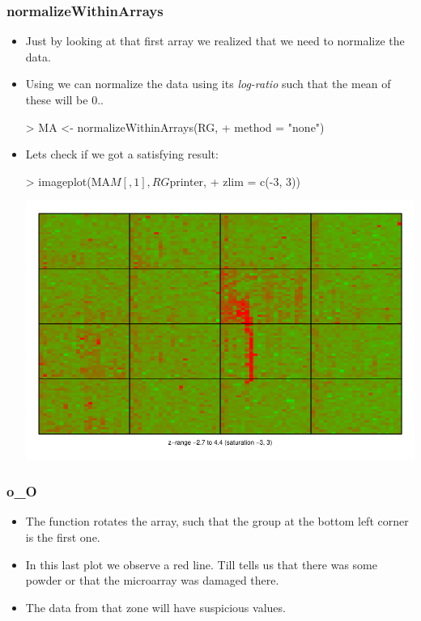 \begin{frame}
  \frametitle{normalizeWithinArrays}
  \begin{itemize}
  \item Just by looking at that first array we realized that we need to normalize the data.
  \item Using  we can normalize the data using its \emph{log-ratio} such that the mean of these will be 0..
\begin{Schunk}
\begin{Sinput}
> MA <- normalizeWithinArrays(RG, 
+     method = "none")
\end{Sinput}
\end{Schunk}
  \item Lets check if we got a satisfying result: 
\begin{Schunk}
\begin{Sinput}
> imageplot(MA$M[, 1], RG$printer, 
+     zlim = c(-3, 3))
\end{Sinput}
\end{Schunk}
\includegraphics{plots/fig-022}
  \end{itemize}
\end{frame}

\begin{frame}[allowframebreaks]
  \frametitle{o\_O}
  \begin{itemize}
  \item The function  rotates the array, such that the group at the bottom left corner is the first one.
  \item In this last plot we observe a red line. Till tells us that there was some powder or that the microarray was damaged there.
  \item The data from that zone will have suspicious values.
  \end{itemize}
\end{frame}

